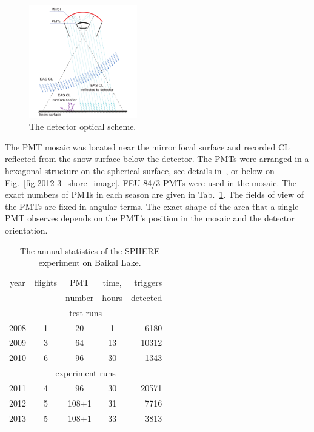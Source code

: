 \documentclass[universe,article,submit,moreauthors,pdftex]{Definitions/mdpi}
\begin{document}
\begin{figure}[bt]
\centering
    \includegraphics[width=0.42\textwidth]{optics}
    \caption{The detector optical scheme.}
\label{fig:optics}
\end{figure}

The PMT mosaic was located near the mirror focal surface and recorded CL reflected from the snow surface below the detector. The PMTs were arranged in a hexagonal structure on the spherical surface, see details in~\cite{Ant20}, or below on Fig.~\ref{fig:2012-3_shore_image}. FEU-84/3 PMTs were used in the mosaic. The exact numbers of PMTs in each season are given in Tab.~\ref{tab:statistics}. The fields of view of the PMTs are fixed in angular terms. The exact shape of the area that a single PMT observes depends on the PMT's position in the mosaic and the detector orientation.

\begin{table}[tb]
\centering
\caption{The annual statistics of the SPHERE experiment on Baikal Lake.
}
\label{tab:statistics}
\vspace{1pc}
\begin{tabular}{|c||c|c|c|r|r|}
    \hline
    year  & flights & PMT    & time, & triggers \\ 
          &         & number & hours & detected \\ 
    \hline \hline
    \multicolumn{5}{|c|}{test runs} \\
    \hline
    2008 & 1 &  20 &  1 &  6180 \\ 
    2009 & 3 &  64 & 13 & 10312 \\ 
    2010 & 6 &  96 & 30 &  1343 \\
    \hline
    \multicolumn{5}{|c|}{experiment runs} \\
    \hline
    2011 & 4 &  96 & 30 & 20571 \\
    2012 & 5 & 108+1 & 31 &  7716 \\
    2013 & 5 & 108+1 & 33 &  3813 \\
    \hline
\end{tabular}
\end{table}
\end{document}
